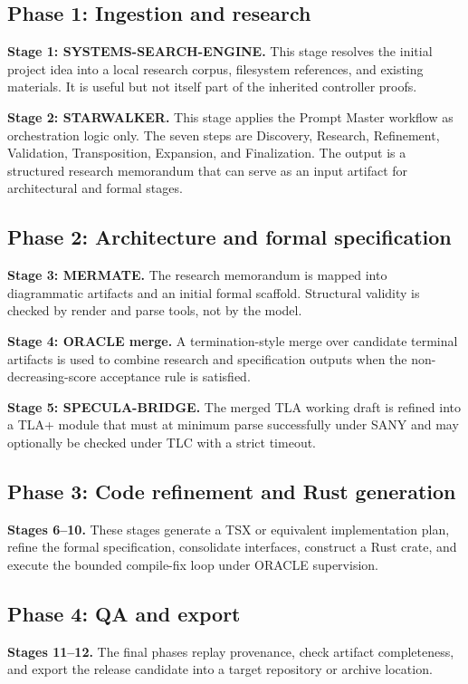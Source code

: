 \documentclass[11pt,a4paper,oneside]{article}
\begin{document}
\subsection{Phase 1: Ingestion and research}
\textbf{Stage 1: SYSTEMS-SEARCH-ENGINE.} This stage resolves the initial project idea into a local research corpus, filesystem references, and existing materials. It is useful but not itself part of the inherited controller proofs.

\textbf{Stage 2: STARWALKER.} This stage applies the Prompt Master workflow as orchestration logic only. The seven steps are Discovery, Research, Refinement, Validation, Transposition, Expansion, and Finalization. The output is a structured research memorandum that can serve as an input artifact for architectural and formal stages.

\subsection{Phase 2: Architecture and formal specification}
\textbf{Stage 3: MERMATE.} The research memorandum is mapped into diagrammatic artifacts and an initial formal scaffold. Structural validity is checked by render and parse tools, not by the model.

\textbf{Stage 4: ORACLE merge.} A termination-style merge over candidate terminal artifacts is used to combine research and specification outputs when the non-decreasing-score acceptance rule is satisfied.

\textbf{Stage 5: SPECULA-BRIDGE.} The merged TLA working draft is refined into a TLA+ module that must at minimum parse successfully under SANY and may optionally be checked under TLC with a strict timeout.

\subsection{Phase 3: Code refinement and Rust generation}
\textbf{Stages 6--10.} These stages generate a TSX or equivalent implementation plan, refine the formal specification, consolidate interfaces, construct a Rust crate, and execute the bounded compile-fix loop under ORACLE supervision.

\subsection{Phase 4: QA and export}
\textbf{Stages 11--12.} The final phases replay provenance, check artifact completeness, and export the release candidate into a target repository or archive location.
\end{document}
